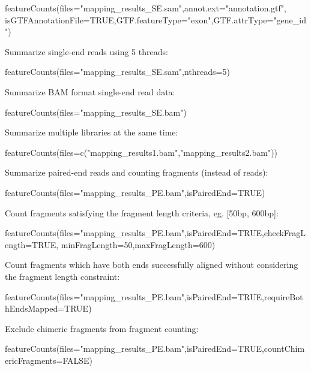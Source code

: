 \documentclass[12pt]{report}
\begin{document}
\begin{Rcode}
featureCounts(files="mapping_results_SE.sam",annot.ext="annotation.gtf",
isGTFAnnotationFile=TRUE,GTF.featureType="exon",GTF.attrType="gene_id")
\end{Rcode}

\noindent Summarize single-end reads using 5 threads:

\begin{Rcode}
featureCounts(files="mapping_results_SE.sam",nthreads=5)
\end{Rcode}

\noindent Summarize BAM format single-end read data:

\begin{Rcode}
featureCounts(files="mapping_results_SE.bam")
\end{Rcode}

\noindent Summarize multiple libraries at the same time:

\begin{Rcode}
featureCounts(files=c("mapping_results1.bam","mapping_results2.bam"))
\end{Rcode}

\noindent Summarize paired-end reads and counting fragments (instead of reads):

\begin{Rcode}
featureCounts(files="mapping_results_PE.bam",isPairedEnd=TRUE)
\end{Rcode}

\noindent Count fragments satisfying the fragment length criteria, eg. [50bp, 600bp]:

\begin{Rcode}
featureCounts(files="mapping_results_PE.bam",isPairedEnd=TRUE,checkFragLength=TRUE,
minFragLength=50,maxFragLength=600)
\end{Rcode}

\noindent Count fragments which have both ends successfully aligned without considering the fragment length constraint:

\begin{Rcode}
featureCounts(files="mapping_results_PE.bam",isPairedEnd=TRUE,requireBothEndsMapped=TRUE)
\end{Rcode}

\noindent Exclude chimeric fragments from fragment counting:

\begin{Rcode}
featureCounts(files="mapping_results_PE.bam",isPairedEnd=TRUE,countChimericFragments=FALSE)
\end{Rcode}
\end{document}

